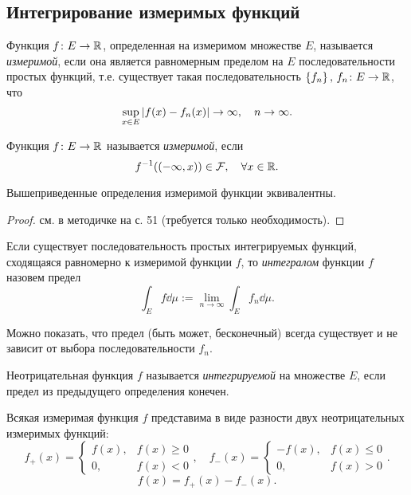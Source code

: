 \subsection{Интегрирование измеримых функций}
\begin{definition}
    Функция $f \colon E \to \mathbb{R}$, определенная на измеримом множестве $E$,
    называется \emph{измеримой}, если она является равномерным пределом на $E$
    последовательности простых функций, т.е. существует такая последовательность
    $\left\{f_n\right\},\, f_n \colon E \to \mathbb{R}$, что
    \[ \sup_{x\in E} \left|f(x) - f_n(x)\right| \to \infty, \quad n \to \infty. \]
\end{definition}

\begin{definition}
    Функция $f \colon E \to \mathbb{R}$ называется \emph{измеримой}, если
    \[ f^{-1}( (-\infty, x) ) \in \mathcal F, \quad \forall x \in \mathbb{R}. \]
\end{definition}

\begin{theorem}
    Вышеприведенные определения измеримой функции эквивалентны.
\end{theorem}

\begin{proof}
    см. в методичке на с. 51 (требуется только необходимость).
\end{proof}

\begin{definition}
    Если существует последовательность простых интегрируемых функций,
    сходящаяся равномерно к измеримой функции $f$, то \emph{интегралом} функции $f$
    назовем предел
    \[ \int_E f \dd \mu := \lim_{n\to \infty} \int_E f_n \dd \mu. \]
\end{definition}

Можно показать, что предел (быть может, бесконечный) всегда существует и не
зависит от выбора последовательности $f_n$.

\begin{definition}
    Неотрицательная функция $f$ называется \emph{интегрируемой} на множестве $E$, если предел из
    предыдущего определения конечен.
\end{definition}

Всякая измеримая функция $f$ представима в виде разности двух неотрицательных
измеримых функций:
\[ f_+(x) = 
    \begin{cases}
        f(x), & f(x) \geq 0 \\
        0, & f(x) < 0
    \end{cases}, \quad
   f_-(x) = 
    \begin{cases}
        -f(x), & f(x) \leq 0 \\
        0, & f(x) > 0
\end{cases}. \]
\[ f(x) = f_+(x) - f_-(x). \]

